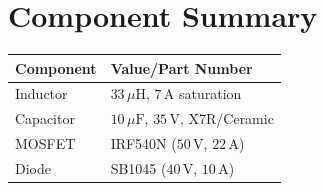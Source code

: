\documentclass{article}
\begin{document}
\section*{Component Summary}
\begin{tabular}{|l|l|}
\hline
\textbf{Component} & \textbf{Value/Part Number} \\
\hline
Inductor & \(33\,\mu\text{H}\), \(7\,\text{A}\) saturation \\
Capacitor & \(10\,\mu\text{F}\), \(35\,\text{V}\), X7R/Ceramic \\
MOSFET & IRF540N (\(50\,\text{V}\), \(22\,\text{A}\)) \\
Diode & SB1045 (\(40\,\text{V}\), \(10\,\text{A}\)) \\
\hline
\end{tabular}
\end{document}
